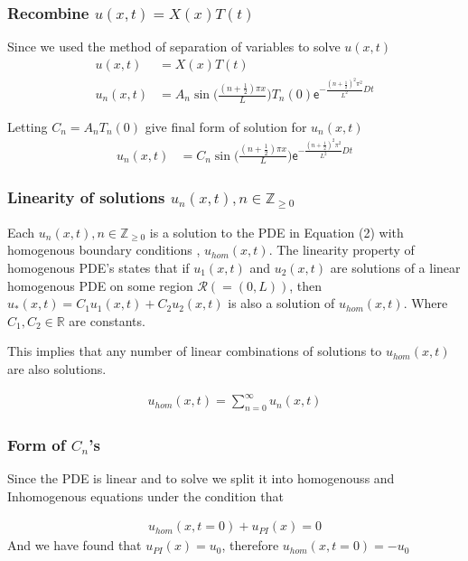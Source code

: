 \documentclass[a4paper]{article}
\begin{document}
\subsubsection{Recombine $u(x,t) = X(x)T(t)$}

Since we used the method of separation of variables to solve $u(x, t)$
\begin{align*}
u(x, t) &= X(x)T(t)  \\
u_{n}(x, t) &= A_{n} \sin \bigg(\frac{(n+\frac{1}{2}) \pi x}{L} \bigg) T_{n}(0)\mathsf{e}^{-\frac{(n+\frac{1}{2})^{2}\pi^{2}}{L^{2}} D t} 
\end{align*}

Letting $C_{n} = A_{n} T_{n}(0)$ give final form of solution for $u_{n}(x,t)$
\begin{align}
u_{n}(x, t) &= C_{n} \sin \bigg(\frac{(n+\frac{1}{2}) \pi x}{L} \bigg) \mathsf{e}^{-\frac{(n+\frac{1}{2})^{2}\pi^{2}}{L^{2}} D t} 
\end{align}

\subsubsection{Linearity of solutions $u_{n}(x,t), n \in \mathbb Z_{\ge 0}$}
Each $u_{n}(x,t), n \in \mathbb Z_{\ge 0}$ is a solution to the PDE in Equation (2) with homogenous boundary conditions , $u_{hom}(x,t)$. The linearity property of homogenous
PDE's states that if $u_{1}(x,t)$ and $u_{2}(x,t)$ are solutions of a linear homogenous PDE on some region $\mathcal{R} (= (0, L))$, then $u_{*}(x,t) = C_{1}u_{1}(x,t) + C_{2}u_{2}(x,t)$
is also a solution of  $u_{hom}(x,t)$. Where $C_{1}, C_{2} \in \mathbb{R}$ are constants. 

\hspace{10mm}

This implies that any number of linear combinations of solutions to $u_{hom}(x,t)$ are also solutions.

\begin{align}
u_{hom}(x,t) = \sum_{n=0}^{\infty}u_{n}(x, t)
\end{align}

\subsubsection{Form of $C_{n}$'s}

Since the PDE is linear and to solve we split it into homogenouss and Inhomogenous equations under the condition that

\begin{align*}
u_{hom}(x,t = 0) + u_{PI}(x) = 0
\end{align*}
And we have found that $u_{PI}(x) = u_{0}$, therefore $u_{hom}(x,t = 0) = -u_{0}$
\end{document}
